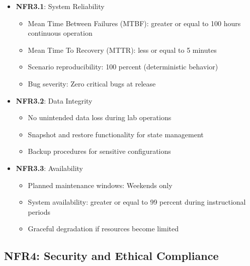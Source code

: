 \begin{itemize}

\item \textbf{NFR3.1}: System Reliability
\begin{itemize}
\item Mean Time Between Failures (MTBF): greater or equal to 100 hours continuous operation
\item Mean Time To Recovery (MTTR): less or equal to 5 minutes
\item Scenario reproducibility: 100 percent (deterministic behavior)
\item Bug severity: Zero critical bugs at release
\end{itemize}

\item \textbf{NFR3.2}: Data Integrity
\begin{itemize}
\item No unintended data loss during lab operations
\item Snapshot and restore functionality for state management
\item Backup procedures for sensitive configurations
\end{itemize}

\item \textbf{NFR3.3}: Availability
\begin{itemize}
\item Planned maintenance windows: Weekends only
\item System availability: greater or equal to 99 percent during instructional periods
\item Graceful degradation if resources become limited
\end{itemize}

\end{itemize}

\subsection{NFR4: Security and Ethical Compliance}

